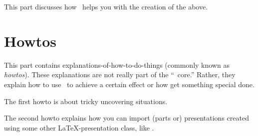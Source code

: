 \documentclass[doc2]{ltxdoc}
\begin{document}
This part discusses how \beamer\ helps you with the creation of the above.








\part{Howtos}

This part contains explanations-of-how-to-do-things (commonly known as \emph{howtos}). These explanations are not really part of the ``\beamer\ core.'' Rather, they explain how to use \beamer\ to achieve a certain effect or how get something special done.

The first howto is about tricky uncovering situations.

The second howto explains how you can import (parts or) presentations created using some other \LaTeX-presentation class, like \prosper.




\end{document}
